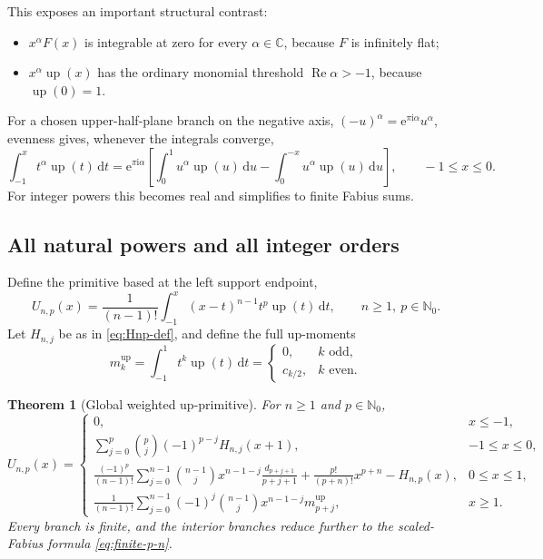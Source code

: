 \documentclass[11pt,oneside]{article}
\newtheorem{theorem}{Theorem}[section]
\theoremstyle{definition}
\theoremstyle{remark}
\newcommand{\Up}{\operatorname{up}}
\newcommand{\C}{\mathbb C}
\newcommand{\N}{\mathbb N}
\newcommand{\dd}{\,\mathrm d}
\newcommand{\e}{\mathrm e}
\newcommand{\ii}{\mathrm i}
\newcommand{\1}{\mathbf 1}
\DeclareMathOperator{\Rea}{Re}
\begin{document}
This exposes an important structural contrast:
\begin{itemize}
\item \(x^\alpha F(x)\) is integrable at zero for every
      \(\alpha\in\C\), because \(F\) is infinitely flat;
\item \(x^\alpha\Up(x)\) has the ordinary monomial threshold
      \(\Rea\alpha>-1\), because \(\Up(0)=1\).
\end{itemize}
For a chosen upper-half-plane branch on the negative axis,
\((-u)^\alpha=\e^{\pi\ii\alpha}u^\alpha\), evenness gives, whenever the
integrals converge,
\begin{equation}
 \int_{-1}^xt^\alpha\Up(t)\dd t
 =\e^{\pi\ii\alpha}
 \left[
 \int_0^1u^\alpha\Up(u)\dd u-
 \int_0^{-x}u^\alpha\Up(u)\dd u
 \right],\qquad -1\leq x\leq0.                                \label{eq:up-negative-alpha}
\end{equation}
For integer powers this becomes real and simplifies to finite Fabius sums.

\subsection{All natural powers and all integer orders}
Define the primitive based at the left support endpoint,
\begin{equation}
 U_{n,p}(x)=\frac1{(n-1)!}\int_{-1}^x(x-t)^{n-1}t^p\Up(t)\dd t,
 \qquad n\geq1,\ p\in\N_0.                                    \label{eq:Unp-def}
\end{equation}
Let \(H_{n,j}\) be as in \eqref{eq:Hnp-def}, and define the full up-moments
\begin{equation}
 m_k^{\Up}=\int_{-1}^1t^k\Up(t)\dd t
 =\begin{cases}0,&k\text{ odd},\\ c_{k/2},&k\text{ even}.
 \end{cases}                                                    \label{eq:up-full-moment}
\end{equation}

\begin{theorem}[Global weighted up-primitive]\label{thm:up-global}
For \(n\geq1\) and \(p\in\N_0\),
\begin{equation}
 U_{n,p}(x)=
 \begin{cases}
 0,&x\leq-1,\\[1mm]
 \displaystyle
 \sum_{j=0}^p\binom pj(-1)^{p-j}H_{n,j}(x+1),
 &-1\leq x\leq0,\\[4mm]
 \displaystyle
 \frac{(-1)^p}{(n-1)!}
 \sum_{j=0}^{n-1}\binom{n-1}{j}
 x^{n-1-j}\frac{d_{p+j+1}}{p+j+1}
 +\frac{p!}{(p+n)!}x^{p+n}-H_{n,p}(x),
 &0\leq x\leq1,\\[5mm]
 \displaystyle
 \frac1{(n-1)!}\sum_{j=0}^{n-1}(-1)^j\binom{n-1}{j}
 x^{n-1-j}m_{p+j}^{\Up},
 &x\geq1.
 \end{cases}                                                    \label{eq:up-global}
\end{equation}
Every branch is finite, and the interior branches reduce further to the
scaled-Fabius formula \eqref{eq:finite-p-n}.
\end{theorem}
\end{document}
